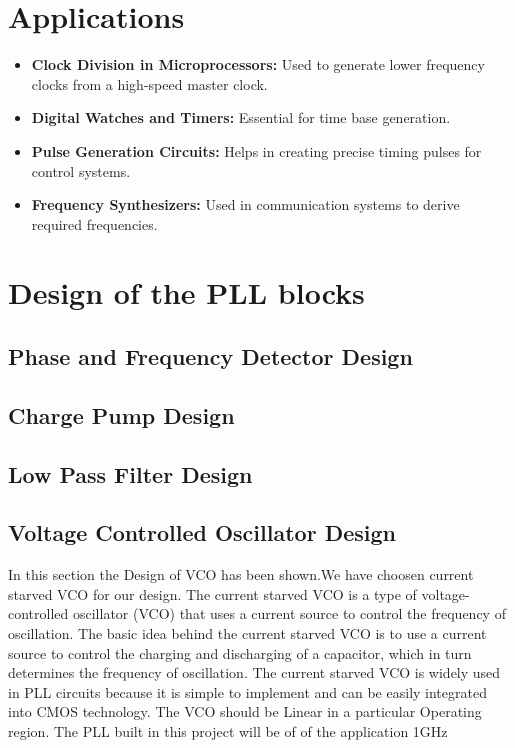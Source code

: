 \section*{Applications}
\begin{itemize}
    \item \textbf{Clock Division in Microprocessors:} Used to generate lower frequency clocks from a high-speed master clock.
    \item \textbf{Digital Watches and Timers:} Essential for time base generation.
    \item \textbf{Pulse Generation Circuits:} Helps in creating precise timing pulses for control systems.
    \item \textbf{Frequency Synthesizers:} Used in communication systems to derive required frequencies.
\end{itemize}
\section{Design of the PLL blocks}
\subsection{Phase and Frequency Detector Design}
\subsection{Charge Pump Design}
\subsection{Low Pass Filter Design}
\subsection{Voltage Controlled Oscillator Design}
In this section the Design of VCO has been shown.We have choosen current starved VCO for our design. The current starved VCO is a type of voltage-controlled oscillator (VCO) that uses a current source to control the frequency of oscillation. The basic idea behind the current starved VCO is to use a current source to control the charging and discharging of a capacitor, which in turn determines the frequency of oscillation. The current starved VCO is widely used in PLL circuits because it is simple to implement and can be easily integrated into CMOS technology.
The VCO should be Linear in a particular Operating region. The PLL built in this project will be of of the application 1GHz



